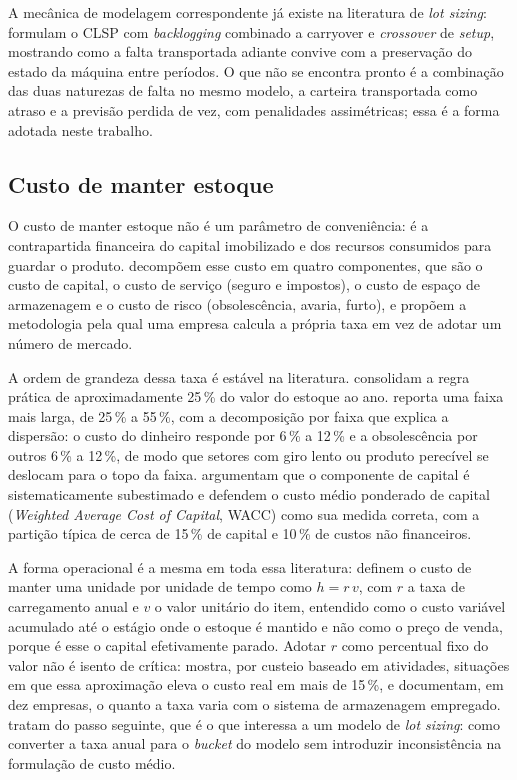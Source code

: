 \documentclass[fleqn,12pt,a4paper]{article}
\begin{document}
A mecânica de modelagem correspondente já existe na literatura de \textit{lot sizing}:  formulam o CLSP com \textit{backlogging} combinado a carryover e \textit{crossover} de \textit{setup}, mostrando como a falta transportada adiante convive com a preservação do estado da máquina entre períodos. O que não se encontra pronto é a combinação das duas naturezas de falta no mesmo modelo, a carteira transportada como atraso e a previsão perdida de vez, com penalidades assimétricas; essa é a forma adotada neste trabalho.

\subsection{Custo de manter estoque}
\label{sec:custo_estoque}

O custo de manter estoque não é um parâmetro de conveniência: é a contrapartida financeira do capital imobilizado e dos recursos consumidos para guardar o produto.  decompõem esse custo em quatro componentes, que são o custo de capital, o custo de serviço (seguro e impostos), o custo de espaço de armazenagem e o custo de risco (obsolescência, avaria, furto), e propõem a metodologia pela qual uma empresa calcula a própria taxa em vez de adotar um número de mercado.

A ordem de grandeza dessa taxa é estável na literatura.  consolidam a regra prática de aproximadamente 25\,\% do valor do estoque ao ano.  reporta uma faixa mais larga, de 25\,\% a 55\,\%, com a decomposição por faixa que explica a dispersão: o custo do dinheiro responde por 6\,\% a 12\,\% e a obsolescência por outros 6\,\% a 12\,\%, de modo que setores com giro lento ou produto perecível se deslocam para o topo da faixa.  argumentam que o componente de capital é sistematicamente subestimado e defendem o custo médio ponderado de capital (\textit{Weighted Average Cost of Capital}, WACC) como sua medida correta, com a partição típica de cerca de 15\,\% de capital e 10\,\% de custos não financeiros.

A forma operacional é a mesma em toda essa literatura:  definem o custo de manter uma unidade por unidade de tempo como $h = r\,v$, com $r$ a taxa de carregamento anual e $v$ o valor unitário do item, entendido como o custo variável acumulado até o estágio onde o estoque é mantido e não como o preço de venda, porque é esse o capital efetivamente parado. Adotar $r$ como percentual fixo do valor não é isento de crítica:  mostra, por custeio baseado em atividades, situações em que essa aproximação eleva o custo real em mais de 15\,\%, e  documentam, em dez empresas, o quanto a taxa varia com o sistema de armazenagem empregado.  tratam do passo seguinte, que é o que interessa a um modelo de \textit{lot sizing}: como converter a taxa anual para o \textit{bucket} do modelo sem introduzir inconsistência na formulação de custo médio.
\end{document}
